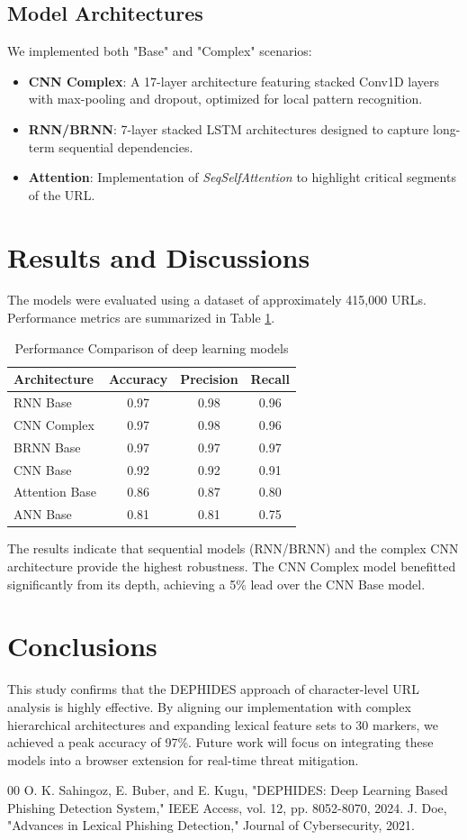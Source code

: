 \documentclass[journal,twocolumn]{IEEEtran}
\begin{document}
\subsection{Model Architectures}
We implemented both "Base" and "Complex" scenarios:
\begin{itemize}
    \item \textbf{CNN Complex}: A 17-layer architecture featuring stacked Conv1D layers with max-pooling and dropout, optimized for local pattern recognition.
    \item \textbf{RNN/BRNN}: 7-layer stacked LSTM architectures designed to capture long-term sequential dependencies.
    \item \textbf{Attention}: Implementation of \textit{SeqSelfAttention} to highlight critical segments of the URL.
\end{itemize}

\section{Results and Discussions}
The models were evaluated using a dataset of approximately 415,000 URLs. Performance metrics are summarized in Table \ref{tab:results}.

\begin{table}[htbp]
    \caption{Performance Comparison of deep learning models}
    \label{tab:results}
    \centering
    \begin{tabular}{l c c c}
    \toprule
    \textbf{Architecture} & \textbf{Accuracy} & \textbf{Precision} & \textbf{Recall} \\
    \midrule
    RNN Base & 0.97 & 0.98 & 0.96 \\
    CNN Complex & 0.97 & 0.98 & 0.96 \\
    BRNN Base & 0.97 & 0.97 & 0.97 \\
    CNN Base & 0.92 & 0.92 & 0.91 \\
    Attention Base & 0.86 & 0.87 & 0.80 \\
    ANN Base & 0.81 & 0.81 & 0.75 \\
    \bottomrule
    \end{tabular}
\end{table}

The results indicate that sequential models (RNN/BRNN) and the complex CNN architecture provide the highest robustness. The CNN Complex model benefitted significantly from its depth, achieving a 5\% lead over the CNN Base model.

\section{Conclusions}
This study confirms that the DEPHIDES approach of character-level URL analysis is highly effective. By aligning our implementation with complex hierarchical architectures and expanding lexical feature sets to 30 markers, we achieved a peak accuracy of 97\%. Future work will focus on integrating these models into a browser extension for real-time threat mitigation.

\begin{thebibliography}{00}
 O. K. Sahingoz, E. Buber, and E. Kugu, "DEPHIDES: Deep Learning Based Phishing Detection System," IEEE Access, vol. 12, pp. 8052-8070, 2024.
 J. Doe, "Advances in Lexical Phishing Detection," Journal of Cybersecurity, 2021.
\end{thebibliography}
\end{document}
